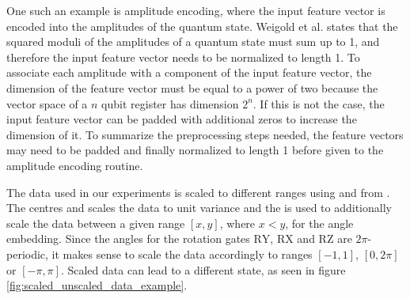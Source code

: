 One such an example is amplitude encoding, where the input feature vector is encoded into the amplitudes of the quantum state. Weigold et al. \cite{Weigold2021_EncodingPatternsForQuantumAlgorithms} states that the squared moduli of the amplitudes of a quantum state must sum up to 1, and therefore the input feature vector needs to be normalized to length 1. To associate each amplitude with a component of the input feature vector, the dimension of the feature vector must be equal to a power of two because the vector space of a $n$ qubit register has dimension $2^n$. If this is not the case, the input feature vector can be padded with additional zeros to increase the dimension of it. To summarize the preprocessing steps needed, the  feature vectors may need to be padded and finally normalized to length 1 before given to the amplitude encoding routine.

The data used in our experiments is scaled to different ranges using \cite{scikit_sklearnpreprocessingminmaxscaler_nodate} and \cite{scikit_sklearnpreprocessingstandardscaler_nodate} from . The  centres and scales the data to unit variance and the  is used to additionally scale the data between a given range $[x, y]$, where $x < y$, for the angle embedding. Since the angles for the rotation gates $\mathrm{RY}$, $\mathrm{RX}$ and $\mathrm{RZ}$ are $2\pi$-periodic, it makes sense to scale the data accordingly to ranges $[-1,1]$, $[0,2\pi]$\cite{schuld2021supervised} or $[-\pi,\pi]$. Scaled data can lead to a different state, as seen in figure \ref{fig:scaled_unscaled_data_example}.

